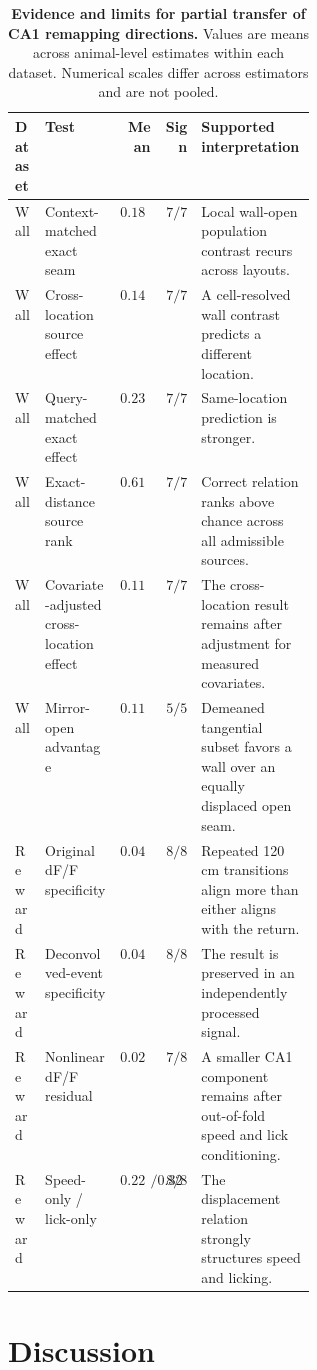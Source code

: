 \documentclass[10pt,twocolumn]{article}
\begin{document}
\begin{table}[t!]
\centering
\caption{\textbf{Evidence and limits for partial transfer of CA1 remapping
directions.}
Values are means across animal-level estimates within each dataset. Numerical
scales differ across estimators and are not pooled.}
\label{tab:evidence}
\small
\begin{tabularx}{\linewidth}{@{}>{\raggedright\arraybackslash}p{0.10\linewidth}
  >{\raggedright\arraybackslash}p{0.25\linewidth}rr
  >{\raggedright\arraybackslash}X@{}}
\toprule
Dataset & Test & Mean & Sign & Supported interpretation\\
\midrule
Wall & Context-matched exact seam & \(0.184\) & \(7/7\) &
Local wall-open population contrast recurs across layouts.\\
Wall & Cross-location source effect & \(0.148\) & \(7/7\) &
A cell-resolved wall contrast predicts a different location.\\
Wall & Query-matched exact effect & \(0.230\) & \(7/7\) &
Same-location prediction is stronger.\\
Wall & Exact-distance source rank & \(0.612\) & \(7/7\) &
Correct relation ranks above chance across all admissible sources.\\
Wall & Covariate-adjusted cross-location effect & \(0.119\) & \(7/7\) &
The cross-location result remains after adjustment for measured covariates.\\
Wall & Mirror-open advantage & \(0.114\) & \(5/5\) &
Demeaned tangential subset favors a wall over an equally displaced open seam.\\
Reward & Original dF/F specificity & \(0.0481\) & \(8/8\) &
Repeated 120 cm transitions align more than either aligns with the return.\\
Reward & Deconvolved-event specificity & \(0.0401\) & \(8/8\) &
The result is preserved in an independently processed signal.\\
Reward & Nonlinear dF/F residual & \(0.0238\) & \(7/8\) &
A smaller CA1 component remains after out-of-fold speed and lick conditioning.\\
Reward & Speed-only / lick-only & \(0.226/0.325\) & \(8/8\) &
The displacement relation strongly structures speed and licking.\\
\bottomrule
\end{tabularx}
\end{table}

\section{Discussion}
\end{document}
